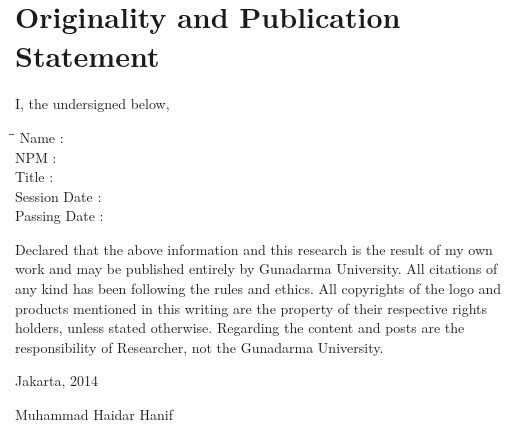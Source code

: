 \begingroup
\let\clearpage\relax
\let\cleardoublepage\relax

\chapter{Originality and Publication Statement}
\label{chap:sig-statement}

I, the undersigned below,

\begin{tabbing}
\hspace*{3cm}\=\hspace*{0.5cm}\= \kill
Name \>:\> \myName \\
NPM \>:\> \myNPM \\
Title \>:\> \myDepTitle \\
Session Date \>:\> \myDateSession \\
Passing Date \>:\> \myDatePassing
\end{tabbing}

Declared that the above information and this research is the result of my own work and may be published entirely by Gunadarma University. All citations of any kind has been following the rules and ethics. All copyrights of the logo and products mentioned in this writing are the property of their respective rights holders, unless stated otherwise. Regarding the content and posts are the responsibility of Researcher, not the Gunadarma University.

\hfill

\noindent Jakarta, 2014

\hfill

\noindent Muhammad Haidar Hanif

\endgroup
